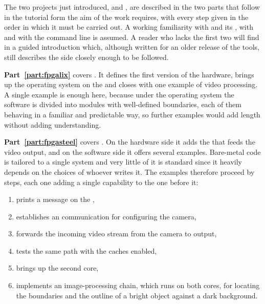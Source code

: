 The two projects just introduced,  and , are described in the two parts that follow in the tutorial form the aim of the work requires, with every step given in the order in which it must be carried out. A working familiarity with  and its , with  and with the  command line is assumed. A reader who lacks the first two will find in \cite{UPM-DE1} a guided introduction which, although written for an older release of the tools, still describes the  side closely enough to be followed.

\textbf{Part~\ref{part:fpgalix}} covers . It defines the first version of the hardware, brings up the operating system on the  and closes with one example of video processing. A single example is enough here, because under the operating system the software is divided into modules with well-defined boundaries, each of them behaving in a familiar and predictable way, so further examples would add length without adding understanding.

\textbf{Part~\ref{part:fpgasteel}} covers . On the hardware side it adds the  that feeds the  video output, and on the software side it offers several examples. Bare-metal code is tailored to a single system and very little of it is standard since it heavily depends on the choices of whoever writes it. The examples therefore proceed by steps, each one adding a single capability to the one before it:

\begin{enumerate}
    \item prints a message on the ,
    \item establishes an  communication for configuring the camera,
    \item forwards the incoming video stream from the camera to  output,
    \item tests the same path with the caches enabled,
    \item brings up the second core,
    \item implements an image-processing chain, which runs on both cores, for locating the boundaries and the outline of a bright object against a dark background.
\end{enumerate}

